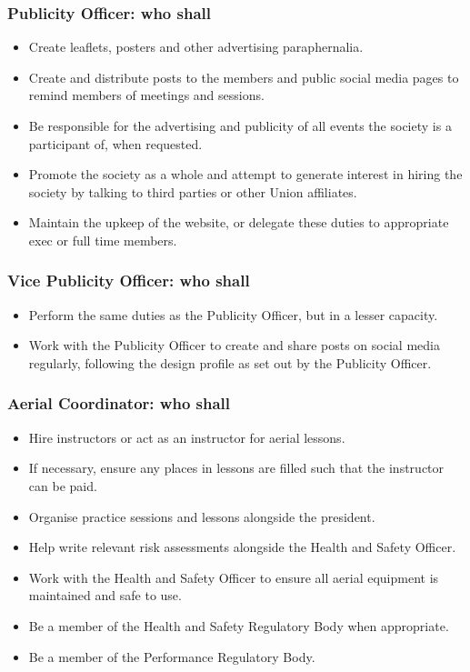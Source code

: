 \documentclass[11pt,a4paper]{article}
\begin{document}
\subsubsection{Publicity Officer: who shall}
\begin{itemize}
    \item Create leaflets, posters and other advertising paraphernalia.
    \item Create and distribute posts to the members and public social media pages to remind members of meetings and sessions.
    \item Be responsible for the advertising and publicity of all events the society is a participant of, when requested.
    \item Promote the society as a whole and attempt to generate interest in hiring the society by talking to third parties or other Union affiliates.
    \item Maintain the upkeep of the website, or delegate these duties to appropriate exec or full time members.
\end{itemize}

\subsubsection{Vice Publicity Officer: who shall}
\begin{itemize}
    \item Perform the same duties as the Publicity Officer, but in a lesser capacity.
    \item Work with the Publicity Officer to create and share posts on social media regularly, following the design profile as set out by the Publicity Officer.
\end{itemize}

\subsubsection{Aerial Coordinator: who shall}
\begin{itemize}
    \item Hire instructors or act as an instructor for aerial lessons.
    \item If necessary, ensure any places in lessons are filled such that the instructor can be paid.
    \item Organise practice sessions and lessons alongside the president.
    \item Help write relevant risk assessments alongside the Health and Safety Officer.
    \item Work with the Health and Safety Officer to ensure all aerial equipment is maintained and safe to use.
    \item Be a member of the Health and Safety Regulatory Body when appropriate.
    \item Be a member of the Performance Regulatory Body.
\end{itemize}
\end{document}

